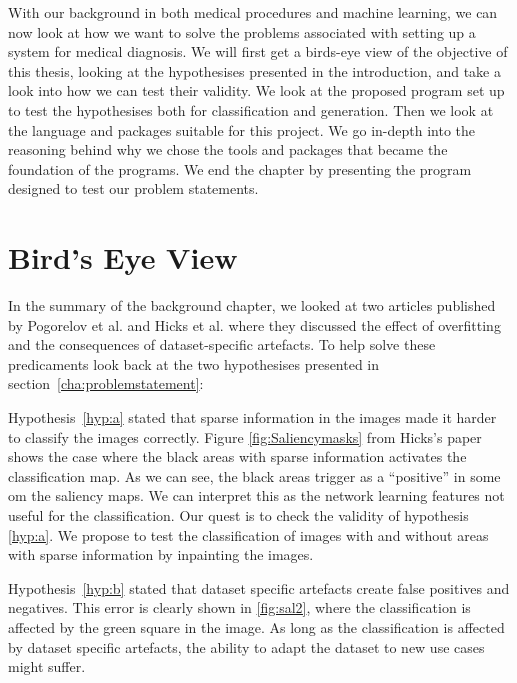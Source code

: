 With our background in both medical procedures and machine learning, we can now look at how we want to solve the problems associated with setting up a system for medical diagnosis.  
We will first get a birds-eye view of the objective of this thesis, looking at the hypothesises presented in the introduction, and take a look into how we can test their validity. We look at the proposed program set up to test the hypothesises both for classification and generation.
Then we look at the language and packages suitable for this project. We go in-depth into the reasoning behind why we chose the tools and packages that became the foundation of the programs. We end the chapter by presenting the program designed to test our problem statements.


\section{Bird's Eye View}
\label{cha:BEW}
In the summary of the background chapter, we looked at two articles published by Pogorelov et al. and Hicks et al. where they discussed the effect of overfitting and the consequences of dataset-specific artefacts.
To help solve these predicaments look back at the two hypothesises presented in section~\ref{cha:problemstatement}:

\vspace{2px}
Hypothesis~\ref{hyp:a} stated that sparse information in the images made it harder to classify the images correctly. Figure \ref{fig:Saliencymasks} from Hicks's paper shows the case where the black areas with sparse information activates the classification map. As we can see, the black areas trigger as a ``positive'' in some om the saliency maps. We can interpret this as the network learning features not useful for the classification. 
Our quest is to check the validity of hypothesis \ref{hyp:a}. We propose to test the classification of images with and without areas with sparse information by inpainting the images.


\vspace{5px}
Hypothesis~\ref{hyp:b} stated that dataset specific artefacts create false positives and negatives. This error is clearly shown in \ref{fig:sal2}, where the classification is affected by the green square in the image. 
As long as the classification is affected by dataset specific artefacts, the ability to adapt the dataset to new use cases might suffer.  


